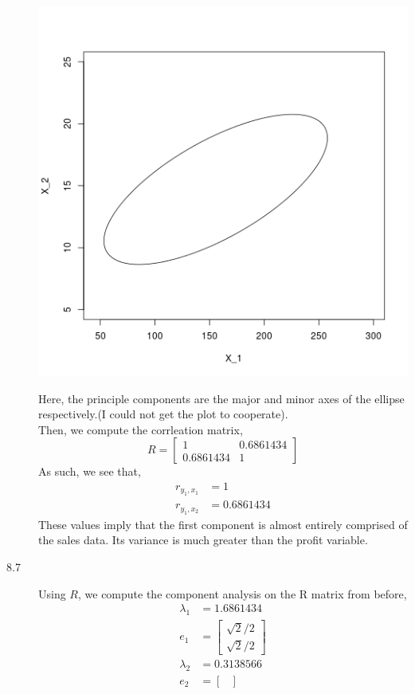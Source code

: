\documentclass[letterpaper,10pt]{article}
\begin{document}
\begin{description}
\begin{center}
\includegraphics[scale=.75]{ellip.png}
\end{center}
Here, the principle components are the major and minor axes of the ellipse respectively.(I could not get the plot to cooperate).\\
Then, we compute the corrleation matrix,
\[R=\begin{bmatrix}
1 & 0.6861434\\ 0.6861434 & 1
\end{bmatrix} \]
As such, we see that,
\begin{align*}
r_{y_1,x_1} &= 1\\
r_{y_1,x_2} &= 0.6861434
\end{align*}
These values imply that the first component is almost entirely comprised of the sales data. Its variance is much greater than the profit variable.
\item[8.7] Using $R$, we compute the component analysis on the R matrix from before,
\begin{align*}
\lambda_1 &= 1.6861434\\
e_1 &= \begin{bmatrix}
\sqrt{2}/2\\\sqrt{2}/2
\end{bmatrix}\\
\lambda_2 &= 0.3138566\\
e_2 &= \begin{bmatrix}

\end{bmatrix}
\end{align*}
\end{description}
\end{document}
